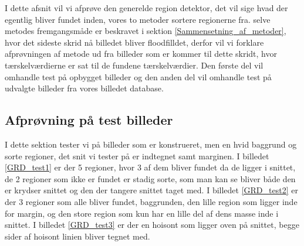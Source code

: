 {\sffamily
I dette afsnit vil vi afprøve den generelde region detektor, det vil
sige hvad der egentlig bliver fundet inden, vores to metoder sortere
regionerne fra. selve metodes fremgangsmåde er beskravet i sektion
\ref{Sammensetning_af_metoder}, hvor det sideste skrid nå billedet
bliver floodfilldet, derfor vil vi forklare afprøvningen af metode ud
fra billeder som er kommer til dette skridt, hvor tærskelværdierne er
sat til de fundene tærskelværdier. Den første del vil omhandle test på
opbygget billeder og den anden del vil omhandle test på udvalgte
billeder fra vores billedet database.
}

\subsection{Afprøvning på test billeder}
I dette sektion tester vi på billeder som er konstrueret, men en hvid
baggrund og sorte regioner, det snit vi tester på er indtegnet samt
marginen. I billedet \ref{GRD_test1} er der 5 regioner, hvor 3 af dem bliver
fundet da de ligger i snittet, de 2 regioner som ikke er fundet er
stadig sorte, som man kan se bliver både den er krydser snittet og den
der tangere snittet taget med. I billedet \ref{GRD_test2} er der 3 regioner som
alle bliver fundet, baggrunden, den lille region som ligger inde for
margin, og den store region som kun har en lille del af dens masse inde
i snittet. I billedet \ref{GRD_test3} er der en hoisont som ligger oven på
snittet, begge sider af hoisont linien bliver tegnet med.


